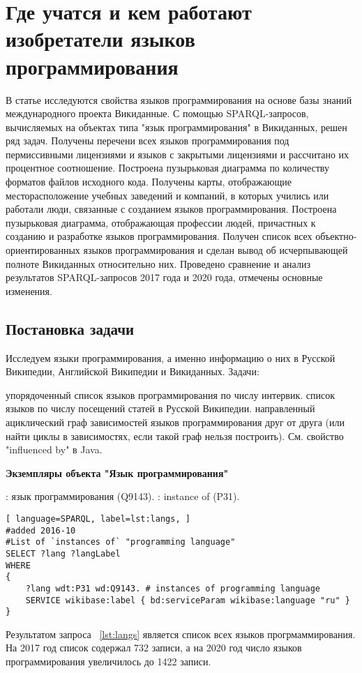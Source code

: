 \chapter{Где учатся и кем работают изобретатели языков программирования}
\label{ch:programming languages}

В статье исследуются свойства языков программирования на основе базы знаний международного проекта Викиданные. С помощью SPARQL-запросов, вычисляемых на объектах типа "язык программирования" в Викиданных, решен ряд задач. Получены перечени всех языков программирования под пермиссивными лицензиями и языков с закрытыми лицензиями и рассчитано их процентное соотношение. Построена пузырьковая диаграмма по количеству форматов файлов исходного кода. Получены карты, отображающие месторасположение учебных заведений и компаний, в которых учились или работали люди, связанные с созданием языков программирования. Построена пузырьковая диаграмма, отображающая профессии людей, причастных к созданию и разработке языков программирования. Получен список всех объектно-ориентированных языков программирования и сделан вывод об исчерпывающей полноте Викиданных относительно них. Проведено сравнение и анализ результатов SPARQL-запросов 2017 года и 2020 года, отмечены основные изменения. 

\section{Постановка задачи}
Исследуем языки программирования, а именно информацию о них в Русской Википедии, Английской Википедии и Викиданных.
Задачи:
\begin{enumerate} 
   упорядоченный список языков программирования по числу интервик.
   список языков по числу посещений статей в Русской Википедии.
   направленный ациклический граф зависимостей языков программирования друг от друга (или найти циклы в зависимостях, если такой граф нельзя построить). См. свойство "influenced by" в Java.
\end{enumerate}

\textbf{Экземпляры объекта "Язык программирования"}
\begin{itemize}
: язык программирования (Q9143).
: instance of (P31).
\end{itemize}
\begin{lstlisting}[ language=SPARQL, label=lst:langs, ]
#added 2016-10
#List of `instances of` "programming language" 
SELECT ?lang ?langLabel
WHERE
{
    ?lang wdt:P31 wd:Q9143. # instances of programming language
    SERVICE wikibase:label { bd:serviceParam wikibase:language "ru" }
}
\end{lstlisting}
Результатом запроса ~\ref{lst:langs} является список всех языков прогрмаммирования. На 2017 год список содержал 732 записи, а на 2020 год число языков программирования увеличилось до 1422 записи.

